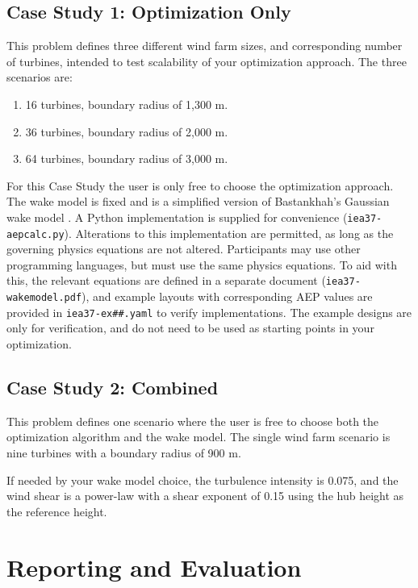 \documentclass[10pt]{article}
\begin{document}
    \subsection{Case Study 1: Optimization Only}

        This problem defines three different wind farm sizes, and corresponding number of turbines, intended to test scalability of your optimization approach.  The three scenarios are:
        \begin{enumerate}
            \item 16 turbines, boundary radius of 1,300 m.
            \item 36 turbines, boundary radius of 2,000 m.
            \item 64 turbines, boundary radius of 3,000 m.
        \end{enumerate}

        For this Case Study the user is only free to choose the optimization approach.
        The wake model is fixed and is a simplified version of Bastankhah's Gaussian wake model \cite{Thomas2018, Bastankhah2014, Bastankhah2016}.
        A Python implementation is supplied for convenience (\texttt{iea37-aepcalc.py}).
        Alterations to this implementation are permitted, as long as the governing physics equations are not altered.
        Participants may use other programming languages, but must use the same physics equations.
        To aid with this, the relevant equations are defined in a separate document (\texttt{iea37-wakemodel.pdf}), and example layouts with corresponding AEP values are provided in \texttt{iea37-ex\#\#.yaml} to verify implementations.
        The example designs are only for verification, and do not need to be used as starting points in your optimization.

    \subsection{Case Study 2: Combined}

        This problem defines one scenario where the user is free to choose both the optimization algorithm and the wake model.
        The single wind farm scenario is nine turbines with a boundary radius of 900 m.
        
        If needed by your wake model choice, the turbulence intensity is 0.075, and the wind shear is a power-law with a shear exponent of 0.15 using the hub height as the reference height.

\section{Reporting and Evaluation}
\end{document}
